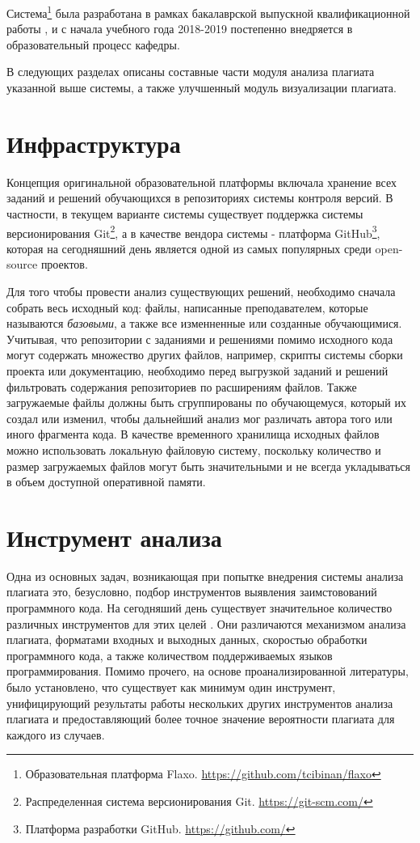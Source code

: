 \documentclass[a4paper,14pt]{extarticle}
\begin{document}
Система\footnote{Образовательная платформа Flaxo. \url{https://github.com/tcibinan/flaxo}} была разработана в рамках бакалаврской выпускной квалификационной работы \citep{flaxoThesis}, и с начала учебного года 2018-2019 постепенно внедряется в образовательный процесс кафедры.

В следующих разделах описаны составные части модуля анализа плагиата указанной выше системы, а также улучшенный модуль визуализации плагиата.

\section{Инфраструктура}

Концепция оригинальной образовательной платформы включала хранение всех заданий и решений обучающихся в репозиториях системы контроля версий. В частности, в текущем варианте системы существует поддержка системы версионирования Git\footnote{Распределенная система версионирования Git. \url{https://git-scm.com/}}, а в качестве вендора системы - платформа GitHub\footnote{Платформа разработки GitHub. \url{https://github.com/}}, которая на сегодняшний день является одной из самых популярных среди open-source проектов.

Для того чтобы провести анализ существующих решений, необходимо сначала собрать весь исходный код: файлы, написанные преподавателем, которые называются \textit{базовыми}, а также все изменненные или созданные обучающимися. Учитывая, что репозитории с заданиями и решениями помимо исходного кода могут содержать множество других файлов, например, скрипты системы сборки проекта или документацию, необходимо перед выгрузкой заданий и решений фильтровать содержания репозиториев по расширениям файлов. Также загружаемые файлы должны быть сгруппированы по обучающемуся, который их создал или изменил, чтобы дальнейший анализ мог различать автора того или иного фрагмента кода. В качестве временного хранилища исходных файлов можно использовать локальную файловую систему, поскольку количество и размер загружаемых файлов могут быть значительными и не всегда укладываться в объем доступной оперативной памяти.

\section{Инструмент анализа}

Одна из основных задач, возникающая при попытке внедрения системы анализа плагиата это, безусловно, подбор инструментов выявления заимстовований программного кода. На сегодняший день существует значительное количество различных инструментов для этих целей \citep{plagiarismToolsSurvey}. Они различаются механизмом анализа плагиата, форматами входных и выходных данных, скоростью обработки программного кода, а также количеством поддерживаемых языков программирования. Помимо прочего, на основе проанализированной литературы, было установлено, что существует как минимум один инструмент, унифицирующий результаты работы нескольких других инструментов анализа плагиата и предоставляющий более точное значение вероятности плагиата для каждого из случаев\citep{unifiedPlagiarismDetectionTool}.
\end{document}
